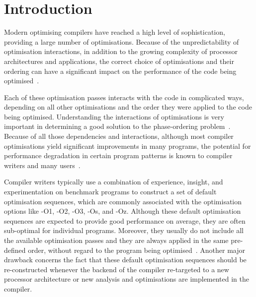 
\chapter{Introduction}

Modern optimising compilers have reached a high level of sophistication, providing a large number of optimisations.
Because of the unpredictability of optimisation interactions, in addition to the growing complexity of processor architectures and applications, the correct choice of optimisations and their ordering can have a significant impact on the performance of the code being optimised~\citep{pan06,fursin07,kulkarni12,purini13}.

Each of these optimisation passes interacts with the code in complicated ways, depending on all other optimisations and the order they were applied to the code being optimised.
Understanding the interactions of optimisations is very important in determining a good solution to the phase-ordering problem~\citep{touati06,kulkarni12}.
Because of all those dependencies and interactions, although most compiler optimisations yield significant improvements in many programs, the potential for performance degradation in certain program patterns is known to compiler writers and many users~\citep{pan06,zhou12,kulkarni12}.

Compiler writers typically use a combination of experience, insight, and experimentation on benchmark programs to construct a set of default optimisation sequences,
which are commonly associated with the optimisation options like {\flagstype -O1}, {\flagstype -O2}, {\flagstype -O3}, {\flagstype -Os}, and {\flagstype -Oz}.
Although these default optimisation sequences are expected to provide good performance on average, they are often sub-optimal for individual programs.
Moreover, they usually do not include all the available optimisation passes and they are always applied in the same pre-defined order, without regard to the program being optimised~\citep{pan06,cavazos07,zhou12,kulkarni12}.
Another major drawback concerns the fact that these default optimisation sequences should be re-constructed whenever the backend of the compiler re-targeted to a new processor architecture or new analysis and optimisations are implemented in the compiler.

